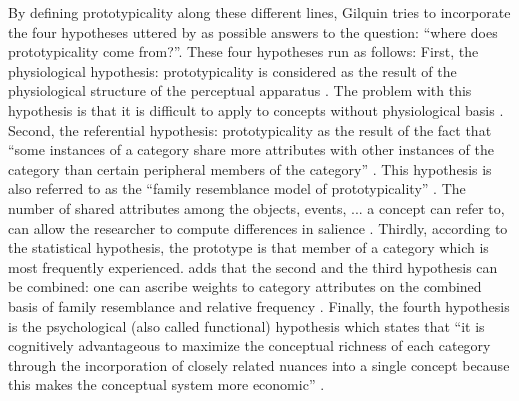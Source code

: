 By defining prototypicality along these different lines, Gilquin tries to incorporate the four hypotheses uttered by \citet{geeraerts_where_2006} as possible answers to the question: “where does prototypicality come from?”. These four hypotheses run as follows: First, the physiological hypothesis: prototypicality is considered as the result of the physiological structure of the perceptual apparatus \citep{moore_internal_1973}. The problem with this hypothesis is that it is difficult to apply to concepts without physiological basis \citet[28]{geeraerts_where_2006}. Second, the referential hypothesis: prototypicality as the result of the fact that “some instances of a category share more attributes with other instances of the category than certain peripheral members of the category” \citet[28]{geeraerts_where_2006}. This hypothesis is also referred to as the “family resemblance model of prototypicality” \citep{rosch_family_1975}. The number of shared attributes among the objects, events, ... a concept can refer to, can allow the researcher to compute differences in salience \citep[29]{geeraerts_where_2006}. Thirdly, according to the statistical hypothesis, the prototype is that member of a category which is most frequently experienced. \citet[29]{geeraerts_where_2006} adds that the second and the third hypothesis can be combined: one can ascribe weights to category attributes on the combined basis of family resemblance and relative frequency \citep{rosch_cognitive_1975}. Finally, the fourth hypothesis is the psychological (also called functional) hypothesis which states that “it is cognitively advantageous to maximize the conceptual richness of each category through the incorporation of closely related nuances into a single concept because this makes the conceptual system more economic” \citep[28]{geeraerts_where_2006}.

